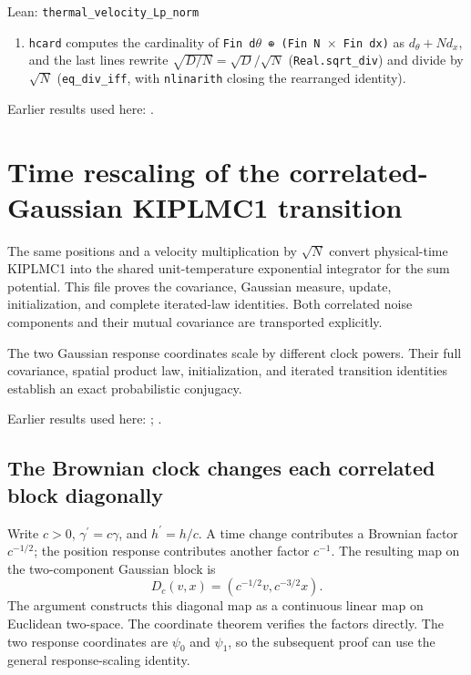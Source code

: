 \documentclass[11pt,a4paper]{report}
\begin{document}
\begin{leanbox}{Lean: \texttt{thermal\_\allowbreak{}velocity\_\allowbreak{}Lp\_\allowbreak{}norm}}
\begin{enumerate}
\item \texttt{hcard} computes the cardinality of \texttt{Fin d\ensuremath{\theta} ⊕ (Fin N \ensuremath{\times} Fin dx)} as \(d_\theta+Nd_x\), and the last lines rewrite \(\sqrt{D/N}=\sqrt D/\sqrt N\) (\texttt{Real.\allowbreak{}sqrt\_\allowbreak{}div}) and divide by \(\sqrt N\) (\texttt{eq\_\allowbreak{}div\_\allowbreak{}iff}, with \texttt{nlinarith} closing the rearranged identity).

\end{enumerate}
\end{leanbox}


Earlier results used here: \cite[Section~3.40.1]{LangevinLean2026Kinetic}.
\section{\texorpdfstring{Time rescaling of the correlated-Gaussian KIPLMC1 transition}{Time rescaling of the correlated-Gaussian KIPLMC1 transition}}
\label{proof-module-KIPLMC-ExponentialRescaling-lean}


The same positions and a velocity multiplication by \(\sqrt N\) convert physical-time KIPLMC1 into the shared unit-temperature exponential integrator for the sum potential. This file proves the covariance, Gaussian measure, update, initialization, and complete iterated-law identities. Both correlated noise components and their mutual covariance are transported explicitly.



The two Gaussian response coordinates scale by different clock powers. Their full covariance, spatial product law, initialization, and iterated transition identities establish an exact probabilistic conjugacy.



Earlier results used here: \cite[Section~3.113]{LangevinLean2026Kinetic}; \cite[Section~3.26]{LangevinLean2026Kinetic}.
\subsection{\texorpdfstring{The Brownian clock changes each correlated block diagonally}{The Brownian clock changes each correlated block diagonally}}
\label{report-step-KIPLMC-ExponentialRescaling-lean-1}


Write \(c>0\), \(\gamma^\prime=c\gamma\), and \(h^\prime=h/c\). A time change contributes a Brownian factor \(c^{-1/2}\); the position response contributes another factor \(c^{-1}\). The resulting map on the two-component Gaussian block is \[D_c(v,x)=(c^{-1/2}v,c^{-3/2}x).\] The argument constructs this diagonal map as a continuous linear map on Euclidean two-space. The coordinate theorem verifies the factors directly. The two response coordinates are \(\psi_0\) and \(\psi_1\), so the subsequent proof can use the general response-scaling identity.
\end{document}
